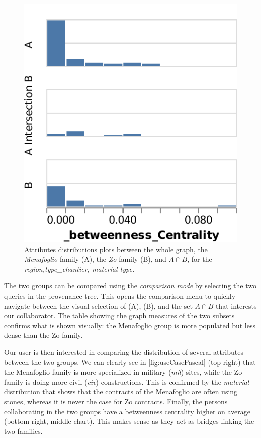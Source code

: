 \begin{figure}[!ht]
     \includegraphics[width=0.34\linewidth]{static/figures/ComBiNet/OriginalPaperFigures/CGF/MenaZoPlots/v2/BC_crop.pdf}

    \caption{Attributes distributions plots between the whole graph, the \textit{Menafoglio} family (A), the \textit{Zo} family (B), and $A\cap B$, for the \textit{region,type\_chantier,  material type.}
    \label{fig:useCasePascal}}
\end{figure}
The two groups can be compared using the \textit{comparison mode} by selecting the two queries in the provenance tree. This opens the comparison menu to quickly navigate between the visual selection of (A), (B), and the set $A \cap B$ that interests our collaborator. The table showing the graph measures of the two subsets confirms what is shown visually: the Menafoglio group is more populated but less dense than the Zo family.

Our user is then interested in comparing the distribution of several attributes between the two groups. We can clearly see in \autoref{fig:useCasePascal} (top right) that the Menafoglio family is more specialized in military (\textit{mil}) sites, while the Zo family is doing more civil (\textit{civ}) constructions. This is confirmed by the \textit{material} distribution that shows that the contracts of the Menafoglio are often using stones, whereas it is never the case for Zo contracts.
Finally, the persons collaborating in the two groups have a betweenness centrality higher on average (bottom right, middle chart).
This makes sense as they act as bridges linking the two families.







